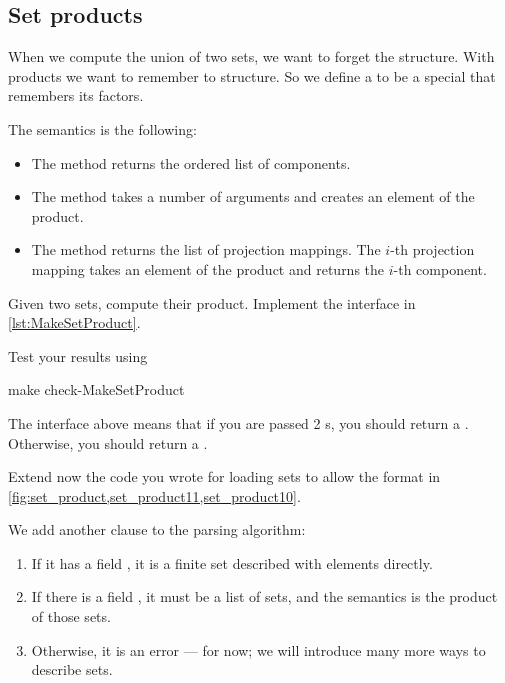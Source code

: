 
\subsection{Set products}

When we compute the union of two sets, we want to forget the structure. With products we want to remember to structure.
So we define a  to be a special \Setoid that remembers its factors.



The semantics is the following:
\begin{itemize}
    \item The method  returns the ordered list of components.
    \item The method  takes a number of arguments and creates an element of the product.
    \item The method  returns the list of projection mappings.
            The $i$-th projection mapping takes an element of the product and returns the $i$-th component.

\end{itemize}


\begin{codeexercise}
  Given two sets, compute their product. Implement the interface in \cref{lst:MakeSetProduct}.

  Test your results using

\begin{console}
  make check-MakeSetProduct
\end{console}

\end{codeexercise}



The interface above means that if you are passed 2 \FiniteSet{}s, you should return a \FiniteSet.
Otherwise, you should return a \Setoid.



%

%

Extend now the code you wrote for loading sets to allow the format in \cref{fig:set_product,set_product11,set_product10}.

We add another clause to the parsing algorithm:
\begin{enumerate}
\item If it has a field , it is a finite set described with elements directly.
\item If there is a field , it must be a list of sets, and the semantics is the product of those sets.
\item Otherwise, it is an error --- for now; we will introduce many more ways to describe sets.
\end{enumerate}


